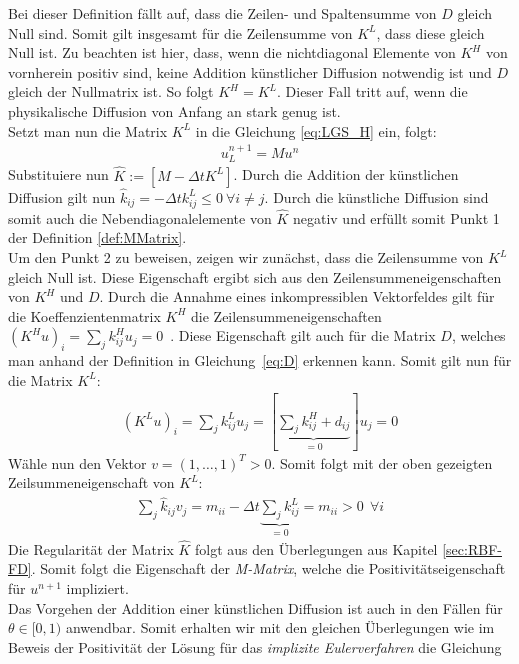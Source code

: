 \documentclass[12pt,titlepage]{article}
\begin{document}
Bei dieser Definition fällt auf, dass die Zeilen- und Spaltensumme von $D$ gleich Null sind. Somit gilt insgesamt für die Zeilensumme von $K^L$, dass diese gleich Null ist. Zu beachten ist hier, dass, wenn die nichtdiagonal Elemente von $K^H$ von vornherein positiv sind, keine Addition künstlicher Diffusion notwendig ist und $D$ gleich der Nullmatrix ist. So folgt $K^H=K^L$. Dieser Fall tritt auf, wenn die physikalische Diffusion von Anfang an stark genug ist.\\
Setzt man nun die Matrix $K^L$ in die Gleichung \eqref{eq:LGS_H} ein, folgt:
\begin{align}
 [M-\Delta tK^L]u_L^{n+1}=Mu^n\nonumber
\end{align}
Substituiere nun $\widehat{K}:=[M-\Delta tK^L]$. Durch die Addition der künstlichen Diffusion gilt nun $\widehat{k}_{ij}=-\Delta tk_{ij}^L\le0~\forall i\neq j$. Durch die künstliche Diffusion sind somit auch die Nebendiagonalelemente von $\widehat{K}$ negativ und erfüllt somit Punkt 1 der Definition \ref{def:MMatrix}.\\
Um den Punkt 2 zu beweisen, zeigen wir zunächst, dass die Zeilensumme von $K^L$ gleich Null ist. Diese Eigenschaft ergibt sich aus den Zeilensummeneigenschaften von $K^H$ und $D$. Durch die Annahme eines inkompressiblen Vektorfeldes gilt für die Koeffenzientenmatrix $K^H$ die Zeilensummeneigenschaften $(K^Hu)_i=\sum_{j}k_{ij}^Hu_j=0$~\cite{kuzmin2005algebraic}. Diese Eigenschaft gilt auch für die Matrix $D$, welches man anhand der Definition in Gleichung~\eqref{eq:D} erkennen kann. Somit gilt nun für die Matrix $K^L$:
\begin{align}
 (K^Lu)_i=\sum_{j}k_{ij}^Lu_j=[\underbrace{\sum_{j}k_{ij}^H+d_{ij}}_{=0}]u_j=0\nonumber
\end{align}
Wähle nun den Vektor $v=(1,\dots,1)^T>0$. Somit folgt mit der oben gezeigten Zeilsummeneigenschaft von $K^L$:
\begin{align}
 \sum_j \widehat{k}_{ij} v_j=m_{ii} - \Delta t\underbrace{\sum_j k_{ij}^L}_{=0}=m_{ii}>0~~\forall i\nonumber
\end{align}
Die Regularität der Matrix $\widehat{K}$ folgt aus den Überlegungen aus Kapitel \ref{sec:RBF-FD}. Somit folgt die Eigenschaft der \textit{M-Matrix}, welche die Positivitätseigenschaft für $u^{n+1}$ impliziert.\\
Das Vorgehen der Addition einer künstlichen Diffusion ist auch in den Fällen für $\theta\in[0,1)$ anwendbar. Somit erhalten wir mit den gleichen Überlegungen wie im Beweis der Positivität der Lösung für das \textit{implizite Eulerverfahren} die Gleichung
\end{document}
